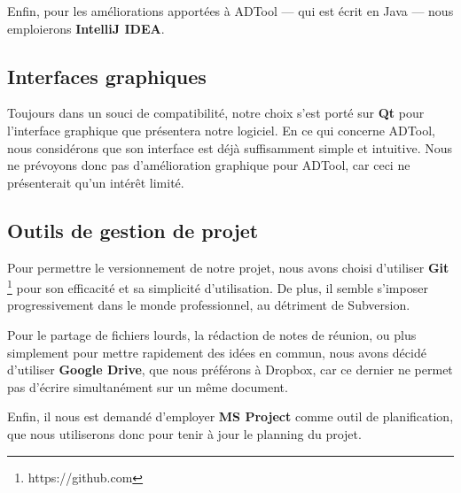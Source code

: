         Enfin, pour les améliorations apportées à ADTool --- qui est écrit en Java --- nous emploierons {\bf IntelliJ IDEA}.

    \subsection{Interfaces graphiques}
        Toujours dans un souci de compatibilité, notre choix s'est porté sur {\bf Qt} pour l'interface graphique que présentera notre logiciel. En ce qui concerne ADTool, nous considérons que son interface est déjà suffisamment simple et intuitive. Nous ne prévoyons donc pas d'amélioration graphique pour ADTool, car ceci ne présenterait qu'un intérêt limité.

	\subsection{Outils de gestion de projet}
        Pour permettre le versionnement de notre projet, nous avons choisi d'utiliser {\bf Git} \footnote{https://github.com} pour son efficacité et sa simplicité d'utilisation. De plus, il semble s'imposer progressivement dans le monde professionnel, au détriment de Subversion.
        
        Pour le partage de fichiers lourds, la rédaction de notes de réunion, ou plus simplement pour mettre rapidement des idées en commun, nous avons décidé d'utiliser {\bf Google Drive}, que nous préférons à Dropbox, car ce dernier ne permet pas d'écrire simultanément sur un même document.

        Enfin, il nous est demandé d'employer {\bf MS Project} comme outil de planification, que nous utiliserons donc pour tenir à jour le planning du projet.